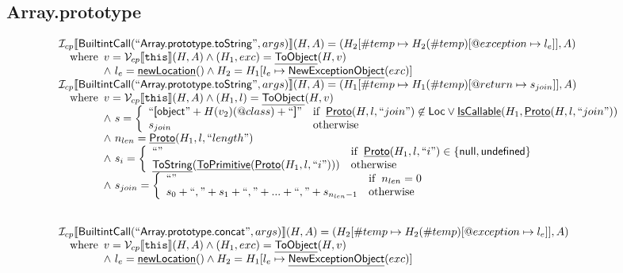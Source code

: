 \documentclass{article}
\makeatletter
\newcommand{\SF}[1]{\mbox{\textsf{#1}}}
\newcommand{\TT}[1]{\mbox{\texttt{#1}}}
\newcommand{\wherec}[1]{{\rm where}\begin{array}[t]{l}#1\end{array}}
\newcommand{\ifc}[1]{{\rm if}\begin{array}[t]{l}#1\end{array}}
\newcommand{\owc}{{\rm otherwise}}
\newcommand{\I}{\mathcal{I}}
\newcommand{\V}{\mathcal{V}}
\newcommand{\lbr}{\llbracket}
\newcommand{\rbr}{\rrbracket}
\newcommand{\hf}[1]{\underline{\sf #1}}
\newcommand{\varloc}[1]{\##1}
\newcommand{\varprop}[1]{@#1}
\makeatother
\begin{document}
\subsection{Array.prototype}
\[
\begin{array}{l}

\I _{cp}\lbr \SF{BuiltintCall}(``\SF{Array.prototype.toString}",args)\rbr(H,A)
 = (H_2[\varloc{temp}\mapsto H_2(\varloc{temp})[\varprop{exception}\mapsto l_e]], A) \\
\quad\wherec{
  v = \V _{cp}\lbr \TT{this}\rbr (H,A) \land (H_1,exc) = \hf{ToObject}(H,v)\\
  \land\ l_e = \hf{newLocation}() \land H_2=H_1[l_e\mapsto\hf{NewExceptionObject}(exc)] 
  }\\

\I _{cp}\lbr \SF{BuiltintCall}(``\SF{Array.prototype.toString}",args)\rbr(H,A)
 = (H_1[\varloc{temp}\mapsto H_1(\varloc{temp})[\varprop{return}\mapsto s_{join}]], A) \\
\quad\wherec{
  v = \V _{cp}\lbr \TT{this}\rbr (H,A) \land (H_1,l) = \hf{ToObject}(H,v)\\
  \land\ s = \left\{
    \begin{array}{ll}
      ``\SF{[object}" + H(v_2)(@class) + ``\SF{]}"
      & \ifc{\hf{Proto}(H,l,``join") \not\in \SF{Loc} \lor \hf{IsCallable}(H_1,\hf{Proto}(H,l,``join"))}\\
      s_{join} & \owc
    \end{array}
    \right.\\
  \land\ n_{len} = \hf{Proto}(H_1, l, ``length")\\
  \land\ s_i = \left\{\begin{array}{ll}
      ``" & \ifc{\hf{Proto}(H_1, l, ``i") \in \{ \SF{null}, \SF{undefined}\}}\\
      \hf{ToString}(\hf{ToPrimitive}(\hf{Proto}(H_1, l, ``i"))) & \owc
    \end{array}\right.\\
  \land\ s_{join} = \left\{\begin{array}{ll}
    ``" & \ifc{n_{len} = 0}\\
    s_0 + ``," + s_1 + ``," + ... + ``," + s_{n_{len}-1} & \owc
    \end{array}\right.\\
  }\\
\\\\


\I _{cp}\lbr \SF{BuiltintCall}(``\SF{Array.prototype.concat}",args)\rbr(H,A)
 = (H_2[\varloc{temp}\mapsto H_2(\varloc{temp})[\varprop{exception}\mapsto l_e]], A) \\
\quad\wherec{
  v = \V _{cp}\lbr \TT{this}\rbr (H,A) \land (H_1,exc) = \hf{ToObject}(H,v)\\
  \land\ l_e = \hf{newLocation}() \land H_2=H_1[l_e\mapsto\hf{NewExceptionObject}(exc)] 
  }\\
   

\end{array}\]
\end{document}

